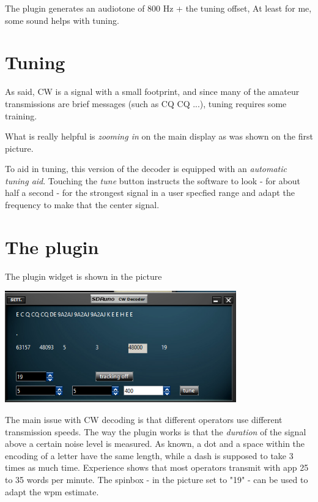 \documentclass[11pt]{article}
\begin{document}
The plugin generates an audiotone of 800 Hz + the tuning offset,
At least for me, some sound helps with tuning.

\section{Tuning}
As said, CW is a signal with a small footprint, and since many of
the amateur transmissions are brief messages (such as CQ CQ ...), tuning
requires some training.
\par
What is really helpful is {\em zooming in} on the main display
as was shown on the first picture.

To aid in tuning, this version of the decoder is equipped with
an {\em automatic tuning aid}.
Touching the {\em tune} button instructs the software to look - for
about half a second - for the strongest signal in a user specfied range
and adapt the frequency to make that the center signal.

\section{The plugin}
The plugin widget  is shown in the picture

\includegraphics[width=100mm]{cw-plugin-widget.png}

The main issue with CW decoding is that different operators use different
transmission speeds.
The way the plugin works is that the {\em duration} of the signal above
a certain noise level is measured. As known, a dot and a space within the
encoding of a letter have the same length, while a dash is supposed to take 3 times as much time.
Experience shows that most operators transmit with app 25 to 35 words per
minute. The spinbox - in the picture set to "19" - can be used to adapt 
the wpm estimate.
\end{document}

